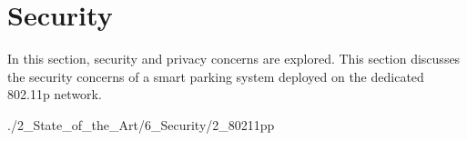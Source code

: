 \section{Security}
In this section, security and privacy concerns are explored. This section discusses the security concerns of a smart parking system deployed on the dedicated 802.11p network.

{./2_State_of_the_Art/6_Security/2_80211pp}